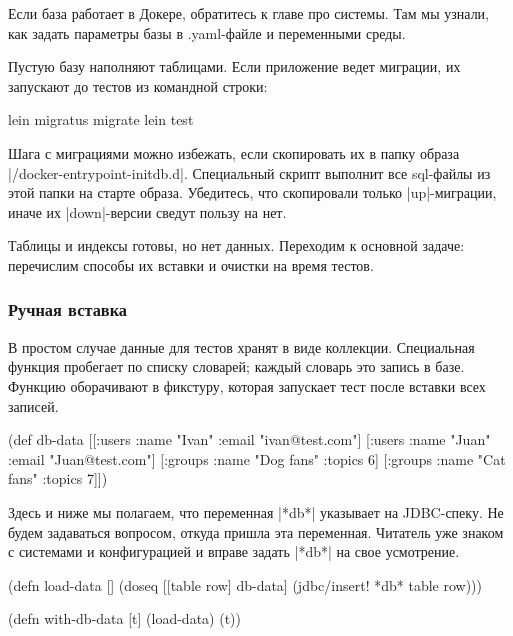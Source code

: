 Если база работает в Докере, обратитесь к главе про системы. Там мы узнали, как
задать параметры базы в .yaml-файле и переменными среды.

Пустую базу наполняют таблицами. Если приложение ведет миграции, их запускают до
тестов из командной строки:

\begin{english}
  \begin{clojure}
lein migratus migrate
lein test
  \end{clojure}
\end{english}

Шага с миграциями можно избежать, если скопировать их в папку образа
\spverb|/docker-entrypoint-initdb.d|. Специальный скрипт выполнит все sql-файлы
из этой папки на старте образа. Убедитесь, что скопировали только
\spverb|up|-миграции, иначе их \spverb|down|-версии сведут пользу на нет.

Таблицы и индексы готовы, но нет данных. Переходим к основной задаче: перечислим
способы их вставки и очистки на время тестов.

\subsubsection*{Ручная вставка}

В простом случае данные для тестов хранят в виде коллекции. Специальная функция
пробегает по списку словарей; каждый словарь это запись в базе. Функцию
оборачивают в фикстуру, которая запускает тест после вставки всех записей.

\begin{english}
  \begin{clojure}
(def db-data
  [[:users {:name "Ivan" :email "ivan@test.com"}]
   [:users {:name "Juan" :email "Juan@test.com"}]
   [:groups {:name "Dog fans" :topics 6}]
   [:groups {:name "Cat fans" :topics 7}]])
  \end{clojure}
\end{english}

Здесь и ниже мы полагаем, что переменная \spverb|*db*| указывает на
JDBC-спеку. Не будем задаваться вопросом, откуда пришла эта переменная. Читатель
уже знаком с системами и конфигурацией и вправе задать \spverb|*db*| на свое
усмотрение.

\begin{english}
  \begin{clojure}
(defn load-data []
  (doseq [[table row] db-data]
    (jdbc/insert! *db* table row)))

(defn with-db-data [t]
  (load-data) (t))
  \end{clojure}
\end{english}

